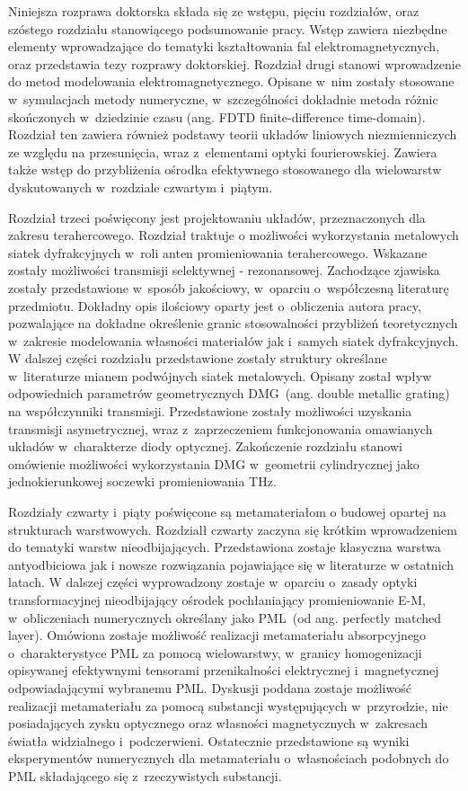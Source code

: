 Niniejsza rozprawa doktorska składa się ze wstępu, pięciu rozdziałów, oraz szóstego rozdziału stanowiącego podsumowanie pracy. Wstęp zawiera niezbędne elementy wprowadzające do tematyki kształtowania fal elektromagnetycznych, oraz przedstawia tezy rozprawy doktorskiej. Rozdział drugi stanowi wprowadzenie do metod modelowania elektromagnetycznego. Opisane w~nim zostały stosowane w~symulacjach metody numeryczne, w~szczególności dokładnie metoda różnic skończonych w~dziedzinie czasu (ang. FDTD finite-difference time-domain). Rozdział ten zawiera również podstawy teorii układów liniowych niezmienniczych ze względu na przesunięcia, wraz z~elementami optyki fourierowskiej. Zawiera także wstęp do przybliżenia ośrodka efektywnego stosowanego dla wielowarstw dyskutowanych w~rozdziale czwartym i~piątym.

Rozdział trzeci poświęcony jest projektowaniu układów, przeznaczonych dla zakresu terahercowego. Rozdział traktuje o możliwości wykorzystania metalowych siatek dyfrakcyjnych w~roli anten promieniowania terahercowego. Wskazane zostały możliwości transmisji  selektywnej - rezonansowej. Zachodzące zjawiska zostały przedstawione w~sposób jakościowy, w~oparciu o~współczesną literaturę przedmiotu. Dokładny opis ilościowy oparty jest o~obliczenia autora pracy, pozwalające na dokładne określenie granic stosowalności przybliżeń teoretycznych w~zakresie modelowania własności materiałów jak i~samych siatek dyfrakcyjnych. W dalszej części rozdziału przedstawione zostały struktury określane w~literaturze mianem podwójnych siatek metalowych. Opisany został wpływ odpowiednich parametrów geometrycznych DMG~(ang. double metallic grating) na współczynniki transmisji. Przedstawione zostały możliwości uzyskania transmisji asymetrycznej, wraz z~zaprzeczeniem funkcjonowania omawianych układów w~charakterze diody optycznej. Zakończenie rozdziału stanowi omówienie możliwości wykorzystania DMG w~geometrii cylindrycznej jako jednokierunkowej soczewki promieniowania THz.

Rozdziały czwarty i~piąty poświęcone są metamateriałom o budowej opartej na strukturach warstwowych. Rozdzialł czwarty zaczyna się krótkim wprowadzeniem do tematyki warstw nieodbijających. Przedstawiona zostaje klasyczna warstwa antyodbiciowa jak i nowsze rozwiązania pojawiające się w literaturze w ostatnich latach. W dalszej części wyprowadzony zostaje w~oparciu o~zasady optyki transformacyjnej nieodbijający ośrodek pochłaniający promieniowanie E-M, w~obliczeniach numerycznych określany jako PML~(od ang. perfectly matched layer). Omówiona zostaje możliwość realizacji metamateriału absorpcyjnego o~charakterystyce PML za pomocą wielowarstwy, w~granicy homogenizacji opisywanej efektywnymi tensorami przenikalności elektrycznej i~magnetycznej odpowiadającymi wybranemu PML. Dyskusji poddana zostaje możliwość realizacji metamateriału za pomocą substancji występujących w~przyrodzie, nie posiadających zysku optycznego oraz własności magnetycznych w~zakresach światła widzialnego i~podczerwieni. Ostatecznie przedstawione są wyniki eksperymentów numerycznych dla metamateriału o~własnościach podobnych do PML składającego się z~rzeczywistych substancji.


